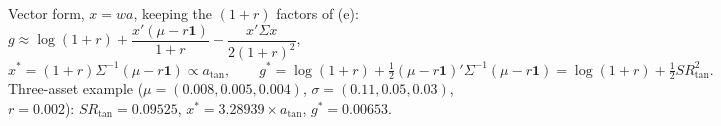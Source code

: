\documentclass[11pt,letterpaper]{article}
\newcommand{\rTanSR}{0.09525}
\newcommand{\rKellyTotal}{3.28939}
\newcommand{\rGVector}{0.00653}
\begin{document}
Vector form, $x=wa$, keeping the $(1+r)$ factors of (e): $g\approx\log(1+r)+\dfrac{x'(\mu-r\mathbf1)}{1+r}-\dfrac{x'\Sigma x}{2(1+r)^2}$,
\[
x^*=(1+r)\Sigma^{-1}(\mu-r\mathbf1)\propto a_{\tan},\qquad g^*=\log(1+r)+\tfrac12(\mu-r\mathbf1)'\Sigma^{-1}(\mu-r\mathbf1)=\log(1+r)+\tfrac12SR_{\tan}^2 .
\]
Three-asset example ($\mu=(0.008,0.005,0.004)$, $\sigma=(0.11,0.05,0.03)$, $r=0.002$): $SR_{\tan}=\rTanSR$, $x^*=\rKellyTotal\times a_{\tan}$, $g^*=\rGVector$.
\end{document}

